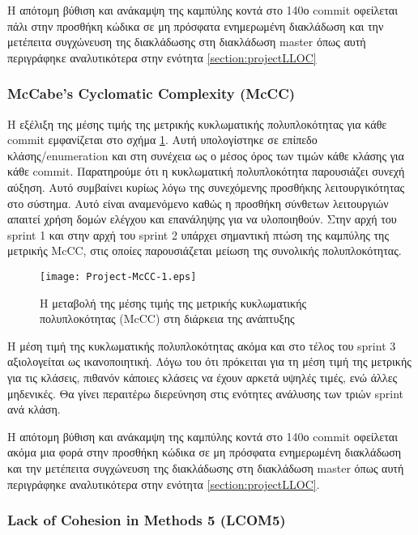 Η απότομη βύθιση και ανάκαμψη της καμπύλης κοντά στο 140ο commit
οφείλεται πάλι στην προσθήκη κώδικα σε μη πρόσφατα ενημερωμένη
διακλάδωση και την μετέπειτα συγχώνευση της διακλάδωσης στη
διακλάδωση master όπως αυτή περιγράφηκε αναλυτικότερα
στην ενότητα \ref{section:projectLLOC}

\subsubsection{McCabe’s Cyclomatic Complexity (McCC)}

Η εξέλιξη της μέσης τιμής της μετρικής κυκλωματικής πολυπλοκότητας για
κάθε commit εμφανίζεται στο σχήμα \ref{fig:projectMcCC}. Αυτή υπολογίστηκε σε
επίπεδο κλάσης/enumeration και στη συνέχεια ως ο μέσος όρος των τιμών
κάθε κλάσης για κάθε commit. Παρατηρούμε ότι η κυκλωματική πολυπλοκότητα
παρουσιάζει συνεχή αύξηση. Αυτό συμβαίνει κυρίως λόγω της συνεχόμενης
προσθήκης λειτουργικότητας στο σύστημα. Αυτό είναι αναμενόμενο καθώς η
προσθήκη σύνθετων λειτουργιών απαιτεί χρήση δομών ελέγχου και επανάληψης
για να υλοποιηθούν. Στην αρχή του sprint 1 και στην αρχή του sprint 2
υπάρχει σημαντική πτώση της καμπύλης της μετρικής McCC, στις οποίες
παρουσιάζεται μείωση της συνολικής πολυπλοκότητας.

\begin{figure}
\centering
\texttt{[image: Project-McCC-1.eps]}
\caption{Η μεταβολή της μέσης τιμής της μετρικής κυκλωματικής
	πολυπλοκότητας (McCC) στη διάρκεια της ανάπτυξης}
\label{fig:projectMcCC}
\end{figure}

Η μέση τιμή της κυκλωματικής πολυπλοκότητας ακόμα και στο τέλος του
sprint 3 αξιολογείται ως ικανοποιητική. Λόγω του ότι πρόκειται για τη
μέση τιμή της μετρικής για τις κλάσεις, πιθανόν κάποιες κλάσεις να έχουν
αρκετά υψηλές τιμές, ενώ άλλες μηδενικές. Θα γίνει περαιτέρω διερεύνηση
στις ενότητες ανάλυσης των τριών sprint ανά κλάση.

Η απότομη βύθιση και ανάκαμψη της καμπύλης κοντά στο 140ο commit
οφείλεται ακόμα μια φορά στην προσθήκη κώδικα σε μη πρόσφατα ενημερωμένη
διακλάδωση και την μετέπειτα συγχώνευση της διακλάδωσης στη διακλάδωση
master όπως αυτή περιγράφηκε αναλυτικότερα στην ενότητα
\ref{section:projectLLOC}.

\subsubsection{Lack of Cohesion in Methods 5 (LCOM5)}

